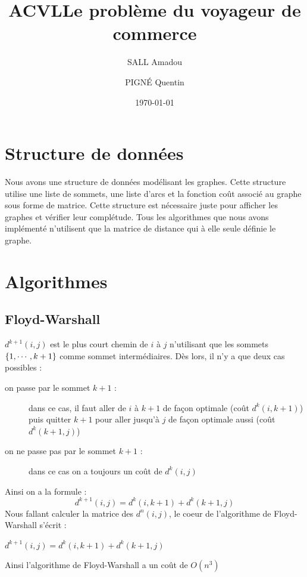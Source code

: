 \documentclass[11pt]{article} \usepackage[top=2cm, bottom=2cm, left=2cm, right=2cm]{geometry}
\title{ACVL} \title{Le problème du voyageur de commerce} \author{SALL Amadou \and PIGN\'E Quentin } \date{\today}
\begin{document}
\maketitle

\section{Structure de données}
Nous avons une structure de données modélisant les graphes. Cette structure utilise une liste de sommets, une liste
d'arcs et la fonction coût associé au graphe sous forme de matrice. Cette structure est nécessaire juste pour afficher
les graphes et vérifier leur complétude. Tous les algorithmes que nous avons implémenté n'utilisent que la matrice de
distance qui à elle seule définie le graphe.
\section{Algorithmes}

\subsection*{Floyd-Warshall}
$d^{k+1}(i,j)$ est le plus court chemin de $i$ à $j$ n'utilisant que les sommets $\left\{1,\cdots,k+1\right\}$ comme sommet
intermédiaires. Dès lors, il n'y a que deux cas possibles :
\begin{description}
    \item[on passe par le sommet $k+1$ :]  dans ce cas, il faut aller de $i$ à $k+1$ de façon optimale (coût
  $d^{k}(i,k+1)$) puis quitter $k+1$ pour aller jusqu'à $j$ de façon optimale aussi (coût $d^{k}(k+1,j)$)
\item[on ne passe pas par le sommet $k+1$ :] dans ce cas on a toujours un coût de $d^{k}(i,j)$
\end{description}
Ainsi on a la formule :
\begin{displaymath}
  d^{k+1}(i,j) = d^{k}(i,k+1) + d^{k}(k+1,j) 
\end{displaymath}
Nous fallant calculer la matrice des $d^{n}(i,j)$, le coeur de l'algorithme de Floyd-Warshall s'écrit :
  \begin{algorithmic}[]
           \State $ d^{k+1}(i,j) = d^{k}(i,k+1) + d^{k}(k+1,j) $
           \EndFor
       \EndFor
   \EndFor
  \end{algorithmic}
Ainsi l'algorithme de Floyd-Warshall a un coût de $O(n^3)$
\end{document}

